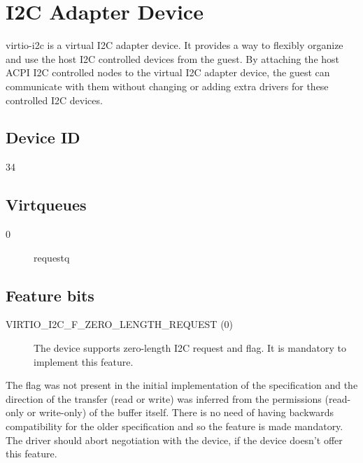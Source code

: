 \section{I2C Adapter Device}\label{sec:Device Types / I2C Adapter Device}

virtio-i2c is a virtual I2C adapter device. It provides a way to flexibly
organize and use the host I2C controlled devices from the guest. By attaching
the host ACPI I2C controlled nodes to the virtual I2C adapter device, the guest can
communicate with them without changing or adding extra drivers for these
controlled I2C devices.

\subsection{Device ID}\label{sec:Device Types / I2C Adapter Device / Device ID}
34

\subsection{Virtqueues}\label{sec:Device Types / I2C Adapter Device / Virtqueues}

\begin{description}
\item[0] requestq
\end{description}

\subsection{Feature bits}\label{sec:Device Types / I2C Adapter Device / Feature bits}

\begin{description}
\item[VIRTIO_I2C_F_ZERO_LENGTH_REQUEST (0)] The device supports zero-length I2C
request and  flag. It is mandatory to implement
this feature.
\end{description}

\begin{note}
The  flag was not present in the initial
implementation of the specification and the direction of the transfer (read or
write) was inferred from the permissions (read-only or write-only) of the
buffer itself. There is no need of having backwards compatibility for the older
specification and so the  feature is made
mandatory. The driver should abort negotiation with the device, if the device
doesn't offer this feature.
\end{note}

